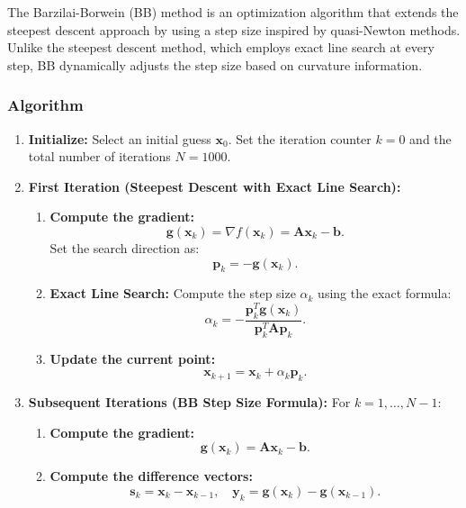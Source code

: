 \documentclass[12pt]{article}
\begin{document}
The Barzilai-Borwein (BB) method is an optimization algorithm that extends the steepest descent approach by using a step size inspired by quasi-Newton methods. Unlike the steepest descent method, which employs exact line search at every step, BB dynamically adjusts the step size based on curvature information.

\subsubsection{Algorithm}
\begin{enumerate}
    \item \textbf{Initialize:}  
    Select an initial guess \( \mathbf{x}_0 \).  
    Set the iteration counter \( k = 0 \) and the total number of iterations \( N = 1000 \).

    \item \textbf{First Iteration (Steepest Descent with Exact Line Search):}
    
    \begin{enumerate}
        \item \textbf{Compute the gradient:}  
        \[
        \mathbf{g}(\mathbf{x}_k) = \nabla f(\mathbf{x}_k) = \mathbf{A} \mathbf{x}_k - \mathbf{b}.
        \]
        Set the search direction as:
        \[
        \mathbf{p}_k = -\mathbf{g}(\mathbf{x}_k).
        \]

        \item \textbf{Exact Line Search:}  
        Compute the step size \( \alpha_k \) using the exact formula:
        \[
        \alpha_k = -\frac{\mathbf{p}_k^T \mathbf{g}(\mathbf{x}_k)}{\mathbf{p}_k^T \mathbf{A} \mathbf{p}_k}.
        \]

        \item \textbf{Update the current point:}  
        \[
        \mathbf{x}_{k+1} = \mathbf{x}_k + \alpha_k \mathbf{p}_k.
        \]
    \end{enumerate}

    \item \textbf{Subsequent Iterations (BB Step Size Formula):}  
    For \( k = 1, \dots, N-1 \):

    \begin{enumerate}
        \item \textbf{Compute the gradient:}  
        \[
        \mathbf{g}(\mathbf{x}_k) = \mathbf{A} \mathbf{x}_k - \mathbf{b}.
        \]

        \item \textbf{Compute the difference vectors:}  
        \[
        \mathbf{s}_{k} = \mathbf{x}_k - \mathbf{x}_{k-1}, \quad
        \mathbf{y}_{k} = \mathbf{g}(\mathbf{x}_k) - \mathbf{g}(\mathbf{x}_{k-1}).
        \]


\end{enumerate}
\end{enumerate}
\end{document}
